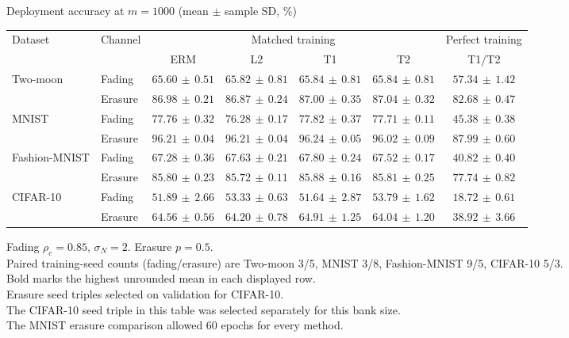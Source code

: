 \documentclass[border=4pt]{standalone}
\begin{document}
\begin{minipage}{7.8in}
\centering
Deployment accuracy at $m=1000$ (mean $\pm$ sample SD, \%)\\[4pt]
\begin{tabular*}{\linewidth}{@{\extracolsep{\fill}}llccccc@{}}
\toprule
\multirow{2}{*}{Dataset} & \multirow{2}{*}{Channel} & \multicolumn{4}{c}{Matched training} & Perfect training \\
\cmidrule(lr){3-6}\cmidrule(l){7-7}
 & & ERM & L2 & T1 & T2 & T1/T2 \\
\midrule
\multirow{2}{*}{Two-moon} & Fading & $65.60\,\pm\,0.51$ & $65.82\,\pm\,0.81$ & $\mathbf{65.84}\,\pm\,0.81$ & $65.84\,\pm\,0.81$ & $57.34\,\pm\,1.42$ \\
 & Erasure & $86.98\,\pm\,0.21$ & $86.87\,\pm\,0.24$ & $87.00\,\pm\,0.35$ & $\mathbf{87.04}\,\pm\,0.32$ & $82.68\,\pm\,0.47$ \\
\midrule[0.25pt]
\multirow{2}{*}{MNIST} & Fading & $77.76\,\pm\,0.32$ & $76.28\,\pm\,0.17$ & $\mathbf{77.82}\,\pm\,0.37$ & $77.71\,\pm\,0.11$ & $45.38\,\pm\,0.38$ \\
 & Erasure & $96.21\,\pm\,0.04$ & $96.21\,\pm\,0.04$ & $\mathbf{96.24}\,\pm\,0.05$ & $96.02\,\pm\,0.09$ & $87.99\,\pm\,0.60$ \\
\midrule[0.25pt]
\multirow{2}{*}{Fashion-MNIST} & Fading & $67.28\,\pm\,0.36$ & $67.63\,\pm\,0.21$ & $\mathbf{67.80}\,\pm\,0.24$ & $67.52\,\pm\,0.17$ & $40.82\,\pm\,0.40$ \\
 & Erasure & $85.80\,\pm\,0.23$ & $85.72\,\pm\,0.11$ & $\mathbf{85.88}\,\pm\,0.16$ & $85.81\,\pm\,0.25$ & $77.74\,\pm\,0.82$ \\
\midrule[0.25pt]
\multirow{2}{*}{CIFAR-10} & Fading & $51.89\,\pm\,2.66$ & $53.33\,\pm\,0.63$ & $51.64\,\pm\,2.87$ & $\mathbf{53.79}\,\pm\,1.62$ & $18.72\,\pm\,0.61$ \\
 & Erasure & $64.56\,\pm\,0.56$ & $64.20\,\pm\,0.78$ & $\mathbf{64.91}\,\pm\,1.25$ & $64.04\,\pm\,1.20$ & $38.92\,\pm\,3.66$ \\
\bottomrule
\end{tabular*}
\par\smallskip\raggedright\footnotesize
Fading $\rho_c=0.85$, $\sigma_N=2$. Erasure $p=0.5$.\\
Paired training-seed counts (fading/erasure) are Two-moon 3/5, MNIST 3/8, Fashion-MNIST 9/5, CIFAR-10 5/3.\\
Bold marks the highest unrounded mean in each displayed row.\\
Erasure seed triples selected on validation for CIFAR-10.\\
The CIFAR-10 seed triple in this table was selected separately for this bank size.\\
The MNIST erasure comparison allowed 60 epochs for every method.
\end{minipage}
\end{document}
